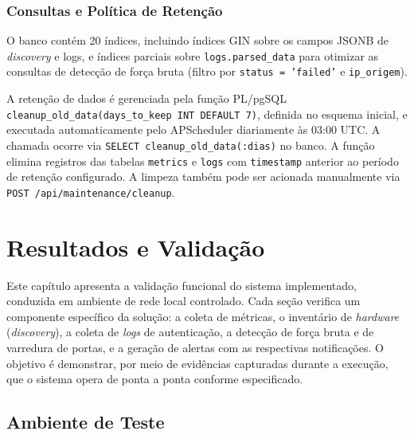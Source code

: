 \documentclass[
    12pt
    ,oneside
    ,a4paper
    ,chapter=TITLE
    ,section=TITLE
    ,sumario=abnt-6027-2012]{abntex2}
\begin{document}
\subsection{Consultas e Política de Retenção}
\label{subsec:retencao}

O banco contém 20 índices, incluindo índices GIN sobre os campos JSONB de
\textit{discovery} e logs, e índices parciais sobre \texttt{logs.parsed\_data} para
otimizar as consultas de detecção de força bruta (filtro por
\texttt{status = 'failed'} e \texttt{ip\_origem}).

A retenção de dados é gerenciada pela função PL/pgSQL
\texttt{cleanup\_old\_data(days\_to\_keep INT DEFAULT 7)}, definida no esquema
inicial, e executada automaticamente pelo APScheduler diariamente às 03:00 UTC.
A chamada ocorre via \texttt{SELECT cleanup\_old\_data(:dias)} no banco. A função
elimina registros das tabelas \texttt{metrics} e \texttt{logs} com
\texttt{timestamp} anterior ao período de retenção configurado. A limpeza também
pode ser acionada manualmente via \texttt{POST /api/maintenance/cleanup}.

\chapter{Resultados e Validação}
\label{cap:resultados}

Este capítulo apresenta a validação funcional do sistema implementado, conduzida em ambiente de rede local controlado. Cada seção verifica um componente específico da solução: a coleta de métricas, o inventário de \textit{hardware} (\textit{discovery}), a coleta de \textit{logs} de autenticação, a detecção de força bruta e de varredura de portas, e a geração de alertas com as respectivas notificações. O objetivo é demonstrar, por meio de evidências capturadas durante a execução, que o sistema opera de ponta a ponta conforme especificado.

\section{Ambiente de Teste}
\label{sec:ambiente-teste}
\end{document}
